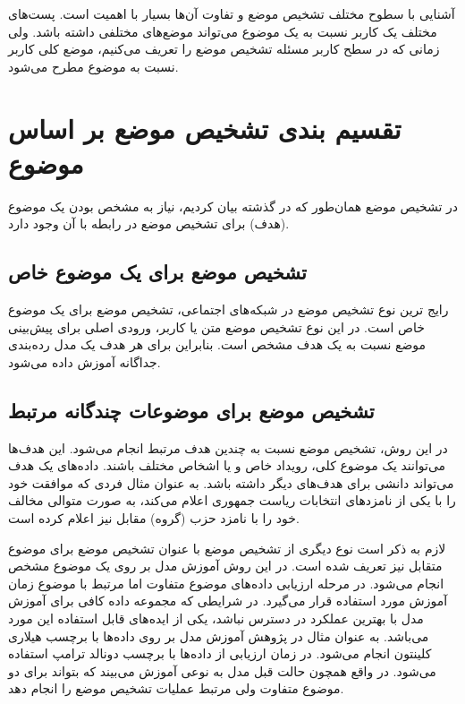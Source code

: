 آشنایی با سطوح مختلف تشخیص موضع و تفاوت آن‌ها بسیار با اهمیت است. پست‌های مختلف یک کاربر نسبت به یک موضوع می‌تواند موضع‌های مختلفی داشته باشد. ولی‌ زمانی که در سطح کاربر مسئله تشخیص موضع را تعریف می‌کنیم، موضع کلی کاربر نسبت به موضوع مطرح می‌شود.

\section{تقسیم بندی تشخیص موضع بر اساس موضوع}
در تشخیص موضع همان‌طور که در گذشته بیان کردیم، نیاز به مشخص بودن یک موضوع (هدف) برای تشخیص موضع در رابطه با آن وجود دارد.

\subsection[تشخیص موضع برای یک موضوع خاص]{تشخیص موضع برای یک موضوع خاص
}
رایج ترین نوع تشخیص موضع در شبکه‌های اجتماعی، تشخیص موضع برای یک موضوع خاص است. در
این نوع تشخیص موضع متن یا کاربر، ورودی اصلی برای پیش‌بینی موضع نسبت به یک هدف مشخص است. بنابراین برای هر هدف یک مدل ردە‌بندی جداگانه آموزش داده می‌شود.

\subsection[تشخیص موضع برای موضوعات چندگانه مرتبط]{تشخیص موضع برای موضوعات چندگانه مرتبط}
در این روش، تشخیص موضع نسبت به چندین هدف مرتبط انجام می‌شود. این هدف‌ها می‌توانند یک موضوع کلی، رویداد خاص و یا اشخاص مختلف باشند. دادە‌های یک هدف می‌تواند دانشی برای هدف‌های دیگر داشته باشد. به عنوان مثال فردی که موافقت خود را با یکی از نامزدهای انتخابات ریاست جمهوری اعلام می‌کند، به صورت متوالی مخالف خود را با نامزد حزب (گروه) مقابل نیز اعلام کرده است.

لازم به ذکر است نوع دیگری از تشخیص موضع با عنوان تشخیص موضع برای موضوع متقابل
نیز تعریف شده است. در این روش آموزش مدل بر روی یک موضوع مشخص انجام می‌شود. در مرحله ارزیابی دادە‌های موضوع متفاوت اما مرتبط با موضوع زمان آموزش مورد استفاده قرار می‌گیرد. در شرایطی که مجموعه داده کافی برای آموزش مدل با بهترین عملکرد در دسترس نباشد، یکی از ایدە‌های قابل استفاده این مورد می‌باشد. به عنوان مثال در پژوهش 
\cite{xu-etal-2018-cross}
آموزش مدل بر روی دادە‌ها با برچسب هیلاری کلینتون انجام می‌شود. در زمان ارزیابی از دادە‌ها با برچسب دونالد ترامپ استفاده می‌شود. در واقع همچون حالت قبل مدل
به نوعی آموزش می‌بیند که بتواند برای دو موضوع متفاوت ولی مرتبط عملیات تشخیص موضع را انجام دهد.

